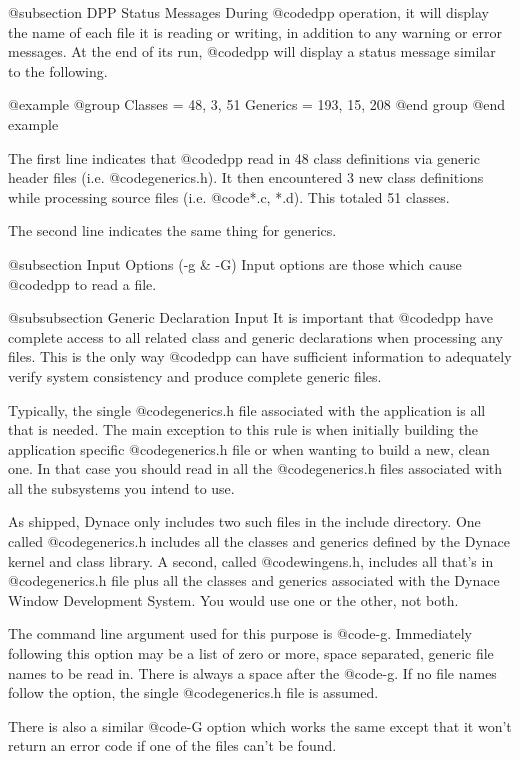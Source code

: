 @subsection DPP Status Messages
During @code{dpp} operation, it will display the name of each file
it is reading or writing, in addition to any warning or error messages.
At the end of its run, @code{dpp} will display a status message similar
to the following.

@example
@group
Classes  = 48, 3, 51
Generics = 193, 15, 208
@end group
@end example

The first line indicates that @code{dpp} read in 48 class definitions
via generic header files (i.e. @code{generics.h}).  It then encountered
3 new class definitions while processing source files
(i.e. @code{*.c, *.d}).  This totaled 51 classes.

The second line indicates the same thing for generics.


@subsection Input Options (-g & -G)
Input options are those which cause @code{dpp} to read a file.

@subsubsection Generic Declaration Input
It is important that @code{dpp} have complete access to all related
class and generic declarations when processing any files.  This is
the only way @code{dpp} can have sufficient information to adequately
verify system consistency and produce complete generic files.

Typically, the single @code{generics.h} file associated with the application
is all that is needed.  The main exception to this rule is when initially
building the application specific @code{generics.h} file or when wanting
to build a new, clean one.  In that case you should read in all the
@code{generics.h} files associated with all the subsystems you intend
to use.

As shipped, Dynace only includes two such files in the include directory.
One called @code{generics.h} includes all the classes and generics
defined by the Dynace kernel and class library.  A second, called
@code{wingens.h}, includes all that's in @code{generics.h} file plus
all the classes and generics associated with the Dynace Window
Development System.  You would use one or the other, not both.

The command line argument used for this purpose is @code{-g}.
Immediately following this option may be a list of zero or more,
space separated, generic file names to be read in.  There is always
a space after the @code{-g}.  If no file names follow the option,
the single @code{generics.h} file is assumed.

There is also a similar @code{-G} option which works the same except
that it won't return an error code if one of the files can't be
found.

